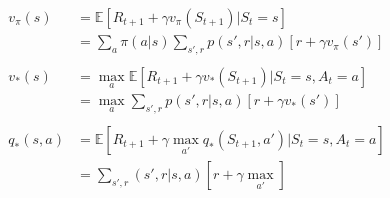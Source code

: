 \documentclass{article}
\begin{document}
\[
  \begin{aligned}
  v_{\pi}(s) &= \mathbb{E}[R_{t+1} + \gamma v_{\pi}(S_{t+1}) | S_{t}=s] \\
  &= \sum_{a}\pi(a|s) \sum_{s',r}p(s',r|s,a)[r + \gamma v_{\pi}(s')]\\
  \\
  v_{*}(s) &= \max_{a}\mathbb{E}[R_{t+1} + \gamma v_{*}(S_{t+1}) | S_{t}=s, A_{t}=a]\\
  &= \max_{a}\sum_{s',r}p(s',r|s,a)[r + \gamma v_{*}(s')]\\
  \\
  q_{*}(s,a) &= \mathbb{E}[R_{t+1} + \gamma \max_{a'}q_{*}(S_{t+1}, a') | S_{t}=s, A_{t}=a]\\
  &= \sum_{s',r}(s',r|s,a)[r + \gamma \max_{a'}]
  \end{aligned}
\]
\end{document}
